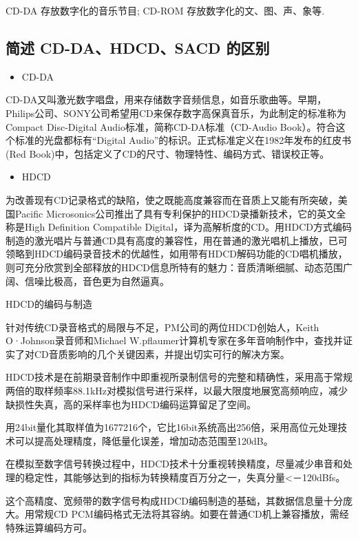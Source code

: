 \documentclass[UTF8,a4paper,AutoFakeBold,AutoFakeSlant]{ctexart}
\begin{document}
CD-DA 存放数字化的音乐节目; CD-ROM 存放数字化的文、图、声、象等.


\subsection{简述 CD-DA、HDCD、SACD 的区别}

\begin{itemize}
	\item CD-DA
\end{itemize}

CD-DA又叫激光数字唱盘，用来存储数字音频信息，如音乐歌曲等。早期，Philips公司、SONY公司希望用CD来保存数字高保真音乐，为此制定的标准称为Compact Disc-Digital Audio标准，简称CD-DA标准（CD-Audio Book）。符合这个标准的光盘都标有“Digital Audio”的标识。正式标准定义在1982年发布的红皮书(Red Book)中，包括定义了CD的尺寸、物理特性、编码方式、错误校正等。

\begin{itemize}
	\item HDCD
\end{itemize}

为改善现有CD记录格式的缺陷，使之既能高度兼容而在音质上又能有所突破，美国Pacific Microsonics公司推出了具有专利保护的HDCD录播新技术，它的英文全称是High Definition Compatible Digital，译为高解析度的CD。用HDCD方式编码制造的激光唱片与普通CD具有高度的兼容性，用在普通的激光唱机上播放，已可领略到HDCD编码录音技术的优越性，如用带有HDCD解码功能的CD唱机播放，则可充分欣赏到全部释放的HDCD信息所特有的魅力：音质清晰细腻、动态范围广阔、信噪比极高，音色更为自然逼真。

HDCD的编码与制造

针对传统CD录音格式的局限与不足，PM公司的两位HDCD创始人，Keith O·Johnson录音师和Michael W.pflaumer计算机专家在多年音响制作中，查找并证实了对CD音质影响的几个关键因素，并提出切实可行的解决方案。

HDCD技术是在前期录音制作中即重视所录制信号的完整和精确性，采用高于常规两倍的取样频率88.1kHz对模拟信号进行采样，以最大限度地展宽高频响应，减少缺损性失真，高的采样率也为HDCD编码运算留足了空间。

用24bit量化其取样值为1677216个，它比16bit系统高出256倍，采用高位元处理技术可以提高处理精度，降低量化误差，增加动态范围至120dB。

在模拟至数字信号转换过程中，HDCD技术十分重视转换精度，尽量减少串音和处理的稳定性，其能够达到的指标为转换精度百万分之一，失真分量<－120dBfs。

这个高精度、宽频带的数字信号构成HDCD编码制造的基础，其数据信息量十分庞大。用常规CD PCM编码格式无法将其容纳。如要在普通CD机上兼容播放，需经特殊运算编码方可。
\end{document}
